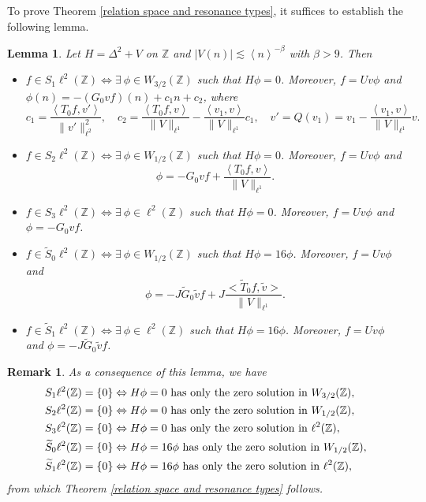 \documentclass[reqno, 11pt]{amsart}
\newtheorem{lemma}[definition]{Lemma}
\newtheorem{remark}[definition]{Remark}
\newcommand\Z{\mathbb{Z}}
\numberwithin{equation}{section}
\begin{document}
To prove Theorem \ref{relation space and resonance types}, it suffices to establish the following lemma.
\begin{lemma}\label{charac of solution and space}
Let $H=\Delta^2+V$ on $\Z$ and $|V(n)|\lesssim \left<n\right>^{-\beta}$ with $\beta>9$. Then
\begin{itemize}
\item [{\rm(i)}]$f\in S_1\ell^2(\Z)\Longleftrightarrow \exists\ \phi\in W_{3/2}(\Z)$ such that $H\phi=0$. Moreover, $f=Uv\phi$ and $\phi(n)=-(G_0vf)(n)+c_1n+c_2$,
    where
    \begin{equation}\label{exp of c1,c2}
    c_1=\frac{\left<T_0f,v'\right>}{\|v'\|^2_{\ell^2}},\quad c_2=\frac{\left<T_0f,v\right>}{\|V\|_{\ell^1}}-\frac{\left<v_1,v\right>}{\|V\|_{\ell^1}}c_1,\quad v'=Q(v_1)=v_1-\frac{\left<v_1,v\right>}{\|V\|_{\ell^1}}v.
    \end{equation}
\item [{\rm(ii)}]$f\in S_2\ell^2(\Z)\Longleftrightarrow \exists\ \phi\in W_{1/2}(\Z)$ such that $H\phi=0$. Moreover, $f=Uv\phi$ and
    $$\phi=-G_0vf+\frac{\left<T_0f,v\right>}{\|V\|_{\ell^1}}.$$
\item [{\rm(iii)}] $f\in S_3\ell^2(\Z)\Longleftrightarrow \exists\ \phi\in \ell^2(\Z)$ such that $H\phi=0$. Moreover, $f=Uv\phi$ and $\phi=-G_0vf$.
\item [{\rm(iv)}] $f\in \widetilde{S}_0\ell^2(\Z)\Longleftrightarrow \exists\ \phi\in W_{1/2}(\Z)$ such that $H\phi=16\phi$. Moreover, $f=Uv\phi$ and
    \begin{equation}\label{exp of c}
    \phi=-J\widetilde{G}_{0}\tilde{v}f+J\frac{\big<\widetilde{T}_0f,\tilde{v}\big>}{\|V\|_{\ell^1}}.
    \end{equation}
\item [{\rm(v)}] $f\in \widetilde{S}_1\ell^2(\Z)\Longleftrightarrow \exists\ \phi\in \ell^2(\Z)$ such that $H\phi=16\phi$. Moreover, $f=Uv\phi$ and $\phi=-J\widetilde{G}_{0}\tilde{v}f$.
\end{itemize}
\end{lemma}
\begin{remark}
{\rm As a consequence of this lemma, we have
\begin{align*}
S_1\ell^2(\Z)&=\{0\}\Leftrightarrow H\phi=0\ {\rm has\  only\ the\  zero\ solution\ in\ }W_{3/2}(\Z),\\
S_2\ell^2(\Z)&=\{0\}\Leftrightarrow H\phi=0\ {\rm has\  only\ the\  zero\ solution\ in\ }W_{1/2}(\Z),\\
S_3\ell^2(\Z)&=\{0\}\Leftrightarrow H\phi=0\ {\rm has\  only\ the\  zero\ solution\ in\ }\ell^2(\Z),\\
\widetilde{S}_0\ell^2(\Z)&=\{0\}\Leftrightarrow H\phi=16\phi\ {\rm has\  only\ the\  zero\ solution\ in\ }W_{1/2}(\Z),\\
\widetilde{S}_1\ell^2(\Z)&=\{0\}\Leftrightarrow H\phi=16\phi\ {\rm has\  only\ the\  zero\ solution\ in\ }\ell^2(\Z),
\end{align*}
from which Theorem \ref{relation space and resonance types} follows. 
}
\end{remark}
\end{document}
